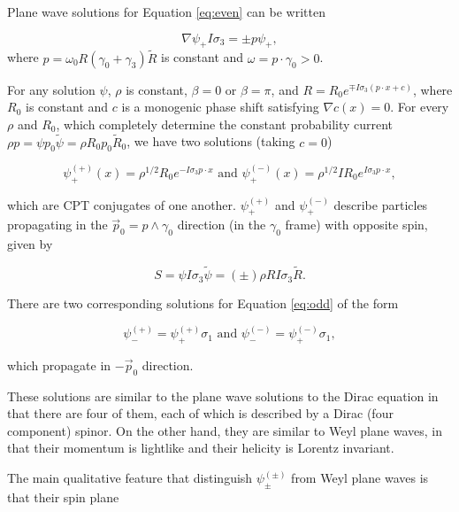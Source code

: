 \documentclass{article}
\begin{document}
  Plane wave solutions for Equation \ref{eq:even} can be written

  \begin{equation}
    \nabla \psi_+ I \sigma_3 = \pm p \psi_+,\label{eq:plane}
  \end{equation}
  where $p = \omega_0 R (\gamma_0 + \gamma_3) \widetilde R$ is constant and $\omega = p \cdot \gamma_0 > 0$.

  For any solution $\psi$, $\rho$ is constant, $\beta = 0$ or $\beta = \pi$, and $R = R_0 e^{\mp I \sigma_3 (p \cdot x + c)}$, where $R_0$ is constant and $c$ is a monogenic phase shift satisfying $\nabla c(x) = 0$. For every $\rho$ and $R_0$, which completely determine the constant probability current $\rho p = \psi p_0 \widetilde \psi = \rho R_0 p_0 \widetilde R_0$, we have two solutions (taking $c = 0$)

  \begin{equation}
    \psi^{(+)}_+(x) = \rho^{1/2} R_0 e^{- I \sigma_3 p \cdot x} \text { and } \psi^{(-)}_+(x) = \rho^{1/2} I R_0 e^{I \sigma_3 p \cdot x},
  \end{equation} 

  which are CPT conjugates of one another. $\psi^{(+)}_+$ and $\psi^{(-)}_+$ describe particles propagating in the $\vec p_0 = p \wedge \gamma_0$ direction (in the $\gamma_0$ frame) with opposite spin, given by 

  \begin{equation}
    S = \psi I \sigma_3 \widetilde \psi = (\pm)\rho R I \sigma_3 \widetilde R.
  \end{equation}

  There are two corresponding solutions for Equation \ref{eq:odd} of the form

  \begin{equation}
    \psi^{(+)}_- = \psi^{(+)}_+ \sigma_1 \text{ and }
    \psi^{(-)}_- = \psi^{(-)}_+ \sigma_1,
  \end{equation}

  which propagate in $-\vec p_0$ direction.

  These solutions are similar to the plane wave solutions to the Dirac equation in that there are four of them, each of which is described by a Dirac (four component) spinor. On the other hand, they are similar to Weyl plane waves, in that their momentum is lightlike and their helicity is Lorentz invariant.

  The main qualitative feature that distinguish $\psi^{(\pm)}_{\pm}$ from Weyl plane waves is that their spin plane 
\end{document}
